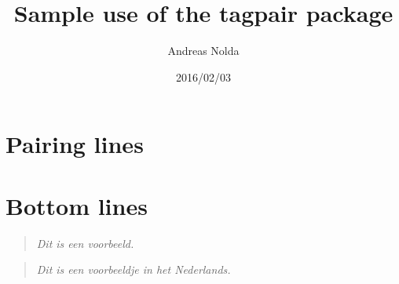 \documentclass[a4paper]{ltxdoc}
\begin{document}
\title{Sample use of the \textsf{tagpair} package}
\author{Andreas Nolda}
\date{2016/02/03}
\maketitle

\section{Pairing lines}

\begin{quote}
\begin{pairingline}
\end{pairingline}
\end{quote}

\begin{quote}
\begin{pairingline}
\end{pairingline}
\end{quote}

\section{Bottom lines}

\begin{quote}
\textdutch{\textit{Dit is een voorbeeld.}}
\end{quote}

\begin{quote}
\textdutch{\textit{Dit is een voorbeeldje in het Nederlands.}}
\end{quote}
\end{document}
